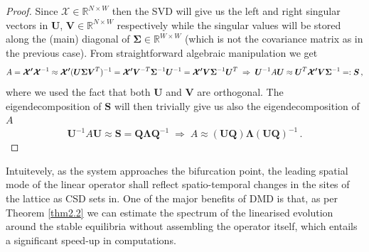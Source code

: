 \documentclass[../main.tex]{subfiles}
\begin{document}
\begin{proof}
     Since $\boldsymbol{\mathcal{X}}\in \mathbb{R}^{N\times W}$ then the SVD will give us the left and right singular vectors in $\boldsymbol{U}$, $\boldsymbol{V}\in \mathbb{R}^{N\times W}$ respectively while the singular values will be stored along the (main) diagonal of $\boldsymbol{\Sigma}\in \mathbb{R}^{W\times W}$ (which is not the covariance matrix as in the previous case).
     From straightforward algebraic manipulation we get
     \begin{equation*}
          A = \boldsymbol{\mathcal{X'}}\boldsymbol{\mathcal{X}}^{-1}\approx \boldsymbol{\mathcal{X'}}(\boldsymbol{U}\boldsymbol{\Sigma}\boldsymbol{V}^{T})^{-1}=\boldsymbol{\mathcal{X'}}\boldsymbol{V}^{-T}\boldsymbol{\Sigma}^{-1}\boldsymbol{U}^{-1} = \boldsymbol{\mathcal{X'}}\boldsymbol{V}\boldsymbol{\Sigma}^{-1}\boldsymbol{U}^{T}\;\Rightarrow\;\boldsymbol{U}^{-1}A \boldsymbol{U}\approx \boldsymbol{U}^{T}\boldsymbol{\mathcal{X'}}\boldsymbol{V}\boldsymbol{\Sigma}^{-1}=:\boldsymbol{S}\,,
     \end{equation*}
     where we used the fact that both $\boldsymbol{U}$ and $\boldsymbol{V}$ are orthogonal. The eigendecomposition of $\boldsymbol{S}$ will then trivially give us also the eigendecomposition of $A$
    \begin{equation*}
         \boldsymbol{U}^{-1}A \boldsymbol{U}\approx \boldsymbol{S}=\boldsymbol{Q}\boldsymbol{\Lambda}\boldsymbol{Q}^{-1}\;\Rightarrow\;A \approx (\boldsymbol{U}\boldsymbol{Q})\boldsymbol{\Lambda}(\boldsymbol{U}\boldsymbol{Q})^{-1}\,.
    \end{equation*}
\end{proof}
Intuitevely, as the system approaches the bifurcation point, the leading spatial mode of the linear operator shall reflect spatio-temporal changes in the sites of the lattice as CSD sets in. One of the major benefits of DMD is that, as per Theorem \ref{thm2.2} we can estimate the spectrum of the linearised evolution around the stable equilibria without assembling the operator itself, which entails a significant speed-up in computations.
\end{document}
